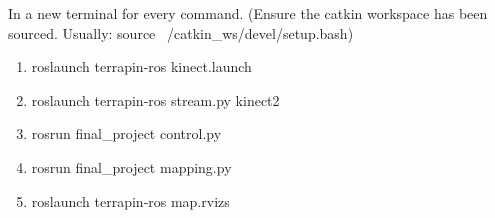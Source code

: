 \documentclass{mproj}
\begin{document}
In a new terminal for every command. (Ensure the catkin workspace has been sourced. Usually: source ~/catkin\_ws/devel/setup.bash)
\begin{enumerate}

\item roslaunch terrapin-ros kinect.launch
\item roslaunch terrapin-ros stream.py kinect2
\item rosrun final\_project control.py
\item rosrun final\_project mapping.py
\item roslaunch terrapin-ros map.rvizs
\end{enumerate}




\end{document}
